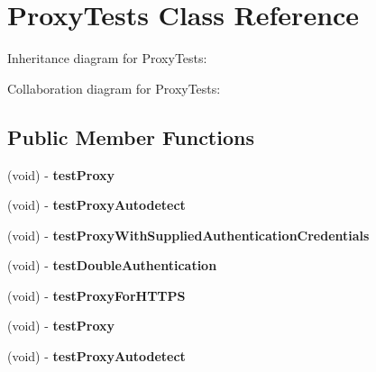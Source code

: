 \hypertarget{interface_proxy_tests}{
\section{\-Proxy\-Tests \-Class \-Reference}
\label{interface_proxy_tests}
}


\-Inheritance diagram for \-Proxy\-Tests\-:


\-Collaboration diagram for \-Proxy\-Tests\-:
\subsection*{\-Public \-Member \-Functions}
\begin{DoxyCompactItemize}
\item 
\hypertarget{interface_proxy_tests_a40fc96bd3915e51e2e1d9121df01b37e}{
(void) -\/ {\bfseries test\-Proxy}}
\label{interface_proxy_tests_a40fc96bd3915e51e2e1d9121df01b37e}

\item 
\hypertarget{interface_proxy_tests_a52703f731ab16ea703ab0b9983b559d2}{
(void) -\/ {\bfseries test\-Proxy\-Autodetect}}
\label{interface_proxy_tests_a52703f731ab16ea703ab0b9983b559d2}

\item 
\hypertarget{interface_proxy_tests_a51146a296d58652cdf040a0e36c39d96}{
(void) -\/ {\bfseries test\-Proxy\-With\-Supplied\-Authentication\-Credentials}}
\label{interface_proxy_tests_a51146a296d58652cdf040a0e36c39d96}

\item 
\hypertarget{interface_proxy_tests_a37018a3f1cce212ab02d59150bf021fc}{
(void) -\/ {\bfseries test\-Double\-Authentication}}
\label{interface_proxy_tests_a37018a3f1cce212ab02d59150bf021fc}

\item 
\hypertarget{interface_proxy_tests_aa344ec9954815b1d25a1d9d60ce5136c}{
(void) -\/ {\bfseries test\-Proxy\-For\-H\-T\-T\-P\-S}}
\label{interface_proxy_tests_aa344ec9954815b1d25a1d9d60ce5136c}

\item 
\hypertarget{interface_proxy_tests_a40fc96bd3915e51e2e1d9121df01b37e}{
(void) -\/ {\bfseries test\-Proxy}}
\label{interface_proxy_tests_a40fc96bd3915e51e2e1d9121df01b37e}

\item 
\hypertarget{interface_proxy_tests_a52703f731ab16ea703ab0b9983b559d2}{
(void) -\/ {\bfseries test\-Proxy\-Autodetect}}
\label{interface_proxy_tests_a52703f731ab16ea703ab0b9983b559d2}


\end{DoxyCompactItemize}
